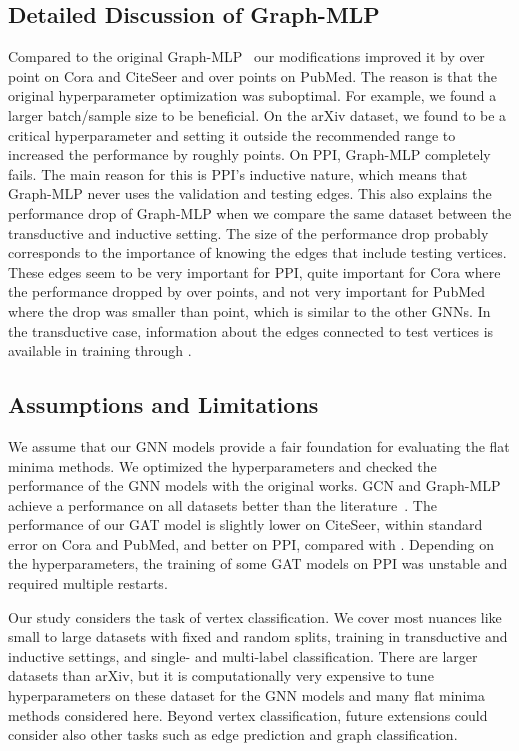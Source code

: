 \documentclass[runningheads]{llncs}
\newcommand{\GraphMLP}{Graph-MLP\xspace}
\begin{document}
\subsection{Detailed Discussion of Graph-MLP}
Compared to the original \GraphMLP~\cite{graphMLPwoMP} our modifications improved it by over  point on Cora and CiteSeer and over  points on PubMed.
The reason is that the original hyperparameter optimization was suboptimal.
For example, we found a larger batch/sample size to be beneficial. 
On the arXiv dataset, we found  to be a critical hyperparameter and setting it outside the recommended  range to  increased the performance by roughly  points.
On PPI, \GraphMLP completely fails.
The main reason for this is PPI's inductive nature, which means that \GraphMLP never uses the validation and testing edges.
This also explains the performance drop of \GraphMLP when we compare the same dataset between the transductive and inductive setting.
The size of the performance drop probably corresponds to the importance of knowing the edges that include testing vertices.
These edges seem to be very important for PPI, quite important for Cora where the performance dropped by over  points, and not very important for PubMed where the drop was smaller than  point, which is similar to the other GNNs.
In the transductive case, information about the edges connected to test vertices is available in training through .


\subsection{Assumptions and Limitations}
We assume that our GNN models provide a fair foundation for evaluating the flat minima methods.
We optimized the hyperparameters and checked the performance of the GNN models with the original works.
GCN and \GraphMLP achieve a performance on all datasets better than the literature~\cite{Kipf17gcn,graphMLPwoMP}.
The performance of our GAT model is slightly lower on CiteSeer, within standard error on Cora and PubMed, and better on PPI, compared with \cite{Velickovic18gat}.
Depending on the hyperparameters, the training of some GAT models on PPI was unstable and required multiple restarts. 

Our study considers the task of vertex classification.
We cover most nuances like small to large datasets with fixed and random splits, training in transductive and inductive settings, and single- and multi-label classification.
There are larger datasets than arXiv, but it is computationally very expensive to tune hyperparameters on these dataset for the GNN models and many flat minima methods considered here.
Beyond vertex classification, future extensions could consider also other tasks such as edge prediction and graph classification.
\end{document}
